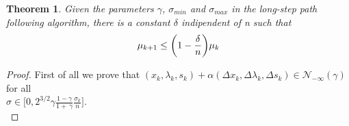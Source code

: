 \documentclass[a4paper,10 pt,titlepage,twoside]{book}
\theoremstyle{plain}
\newtheorem{thm}{Theorem}[chapter]
\theoremstyle{definition}
\theoremstyle{remark}
\begin{document}
\begin{thm}
	Given the parameters $\gamma$, $\sigma_{min}$ and $\sigma_{max}$ in the long-step path following algorithm, there is a constant $\delta$ indipendent of n such that
	\begin{equation}\label{(5.10)}
	\mu_{k+1} \leq \bigg(1 - \frac{\delta}{n}\bigg)\mu_{k}\\
	\end{equation} 
\end{thm}
\begin{proof}
	First of all we prove that $(x_{k}, \lambda_{k}, s_{k})+\alpha(\Delta x_{k},\Delta \lambda_{k},\Delta s_{k})\in\mathcal{N}_{-\infty}(\gamma)$ for all \\$\sigma \in \bigg[0,2^{3/2}\gamma \frac{1 - \gamma}{1 +\ \gamma}\frac{\sigma_{k}}{n}\bigg]$.\\
	

\end{proof}
\end{document}
